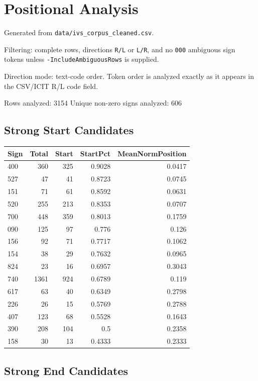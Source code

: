 ﻿\documentclass[11pt,a4paper]{article}
\begin{document}
\section*{Positional Analysis}

Generated from \texttt{data/ivs\_corpus\_cleaned.csv}.

Filtering: complete rows, directions \texttt{R/L} or \texttt{L/R}, and no \texttt{000} ambiguous sign tokens unless \texttt{-IncludeAmbiguousRows} is supplied.

Direction mode: text-code order. Token order is analyzed exactly as it appears in the CSV/ICIT R/L code field.

Rows analyzed: 3154
Unique non-zero signs analyzed: 606

\subsection*{Strong Start Candidates}

\begin{center}
\begin{tabular}{lrrrr}
\toprule
\textbf{Sign} & \textbf{Total} & \textbf{Start} & \textbf{StartPct} & \textbf{MeanNormPosition} \\
\midrule
400 & 360 & 325 & 0.9028 & 0.0417 \\
527 & 47 & 41 & 0.8723 & 0.0745 \\
151 & 71 & 61 & 0.8592 & 0.0631 \\
520 & 255 & 213 & 0.8353 & 0.0707 \\
700 & 448 & 359 & 0.8013 & 0.1759 \\
090 & 125 & 97 & 0.776 & 0.126 \\
156 & 92 & 71 & 0.7717 & 0.1062 \\
154 & 38 & 29 & 0.7632 & 0.0965 \\
824 & 23 & 16 & 0.6957 & 0.3043 \\
740 & 1361 & 924 & 0.6789 & 0.119 \\
617 & 63 & 40 & 0.6349 & 0.2798 \\
226 & 26 & 15 & 0.5769 & 0.2788 \\
407 & 123 & 68 & 0.5528 & 0.1643 \\
390 & 208 & 104 & 0.5 & 0.2358 \\
158 & 30 & 13 & 0.4333 & 0.2333 \\
\bottomrule
\end{tabular}
\end{center}

\subsection*{Strong End Candidates}
\end{document}
